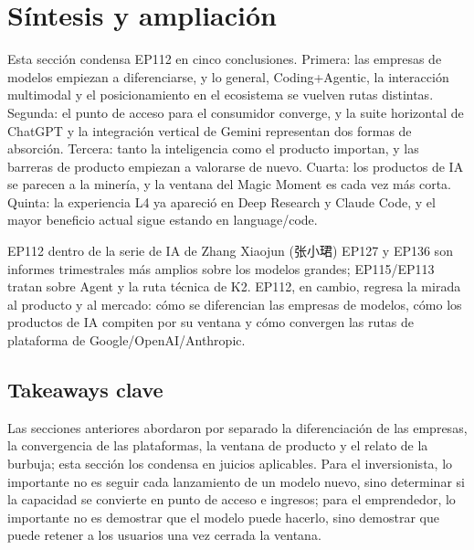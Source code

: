 \section{Síntesis y ampliación}

Esta sección condensa EP112 en cinco conclusiones. Primera: las empresas de modelos empiezan a diferenciarse, y lo general, Coding+Agentic, la interacción multimodal y el posicionamiento en el ecosistema se vuelven rutas distintas. Segunda: el punto de acceso para el consumidor converge, y la suite horizontal de ChatGPT y la integración vertical de Gemini representan dos formas de absorción. Tercera: tanto la inteligencia como el producto importan, y las barreras de producto empiezan a valorarse de nuevo. Cuarta: los productos de IA se parecen a la minería, y la ventana del Magic Moment es cada vez más corta. Quinta: la experiencia L4 ya apareció en Deep Research y Claude Code, y el mayor beneficio actual sigue estando en language/code.

\begin{importantbox}{EP112 dentro de la serie de IA de Zhang Xiaojun (张小珺)}
EP127 y EP136 son informes trimestrales más amplios sobre los modelos grandes; EP115/EP113 tratan sobre Agent y la ruta técnica de K2. EP112, en cambio, regresa la mirada al producto y al mercado: cómo se diferencian las empresas de modelos, cómo los productos de IA compiten por su ventana y cómo convergen las rutas de plataforma de Google/OpenAI/Anthropic.
\end{importantbox}

\subsection{Takeaways clave}

Las secciones anteriores abordaron por separado la diferenciación de las empresas, la convergencia de las plataformas, la ventana de producto y el relato de la burbuja; esta sección los condensa en juicios aplicables. Para el inversionista, lo importante no es seguir cada lanzamiento de un modelo nuevo, sino determinar si la capacidad se convierte en punto de acceso e ingresos; para el emprendedor, lo importante no es demostrar que el modelo puede hacerlo, sino demostrar que puede retener a los usuarios una vez cerrada la ventana.

